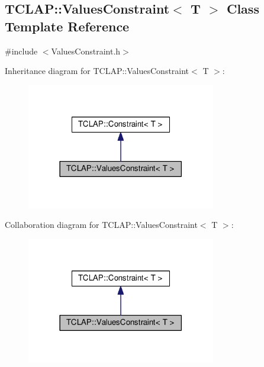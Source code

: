 \hypertarget{classTCLAP_1_1ValuesConstraint}{}\subsection{T\+C\+L\+AP\+:\+:Values\+Constraint$<$ T $>$ Class Template Reference}
\label{classTCLAP_1_1ValuesConstraint}


{\ttfamily \#include $<$Values\+Constraint.\+h$>$}



Inheritance diagram for T\+C\+L\+AP\+:\+:Values\+Constraint$<$ T $>$\+:
\nopagebreak
\begin{figure}[H]
\begin{center}
\leavevmode
\includegraphics[width=234pt]{classTCLAP_1_1ValuesConstraint__inherit__graph}
\end{center}
\end{figure}


Collaboration diagram for T\+C\+L\+AP\+:\+:Values\+Constraint$<$ T $>$\+:
\nopagebreak
\begin{figure}[H]
\begin{center}
\leavevmode
\includegraphics[width=234pt]{classTCLAP_1_1ValuesConstraint__coll__graph}
\end{center}
\end{figure}
